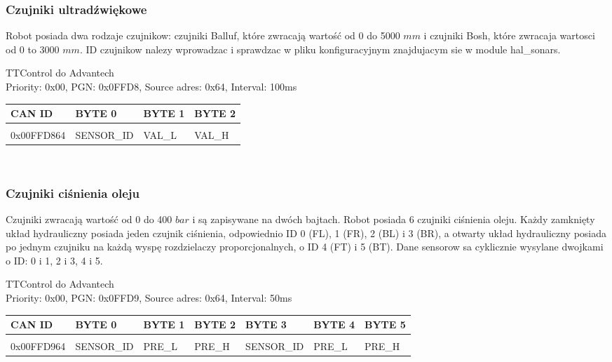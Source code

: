 \documentclass{article}
\begin{document}
\subsubsection{Czujniki ultradźwiękowe}
Robot posiada dwa rodzaje czujnikow: czujniki Balluf, które zwracają wartość od 0 do 5000 $mm$ i czujniki Bosh, które zwracaja wartosci od 0 to 3000 $mm$. ID czujnikow nalezy wprowadzac i sprawdzac w pliku konfiguracyjnym znajdujacym sie w module hal\_sonars.

TTControl do Advantech\\
Priority: 0x00, PGN: 0x0FFD8, Source adres: 0x64, Interval: 100ms\\
\begin{left}
\begin{tabular}{ |p{2cm}|p{2cm}|p{1.4cm}|p{1.4cm}|} 
 \hline
 CAN ID & BYTE 0 & BYTE 1 & BYTE 2 \\ \hline
 & & &\\
0x00FFD864 & SENSOR_ID & VAL\_L & VAL\_H \\ 
 \hline
\end{tabular}
\end{left}\\

\subsubsection{Czujniki ciśnienia oleju}
Czujniki zwracają wartość od 0 do 400 $bar$ i są zapisywane na dwóch bajtach. Robot posiada 6 czujniki ciśnienia oleju. Każdy zamknięty układ hydrauliczny posiada jeden czujnik ciśnienia, odpowiednio ID 0 (FL), 1 (FR), 2 (BL) i  3 (BR), a otwarty układ hydrauliczny posiada po jednym czujniku na każdą wyspę rozdzielaczy proporcjonalnych, o ID 4 (FT) i 5 (BT). Dane sensorow sa cyklicznie wysylane dwojkami o ID: 0 i 1, 2 i 3, 4 i 5.

TTControl do Advantech\\
Priority: 0x00, PGN: 0x0FFD9, Source adres: 0x64, Interval: 50ms\\
\begin{left}
\begin{tabular}{ |p{2cm}|p{2cm}|p{1.5cm}|p{1.5cm}|p{2cm}|p{1.5cm}|p{1.5cm}|} 
 \hline
 CAN ID & BYTE 0 & BYTE 1 & BYTE 2 & BYTE 3 & BYTE 4 & BYTE 5\\ \hline
 & & & & & &\\
0x00FFD964 & SENSOR\_ID & PRE\_L & PRE\_H & SENSOR\_ID & PRE\_L & PRE\_H \\ 
 \hline
\end{tabular}
\end{left}\\
\end{document}
